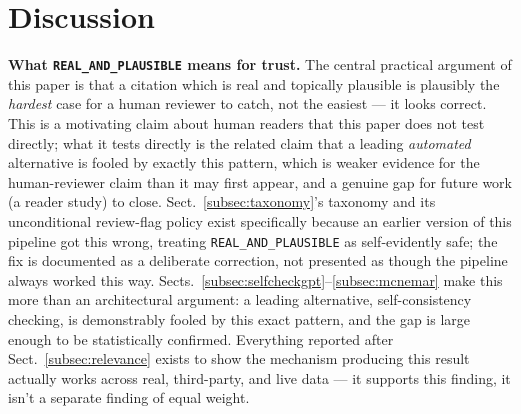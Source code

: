 \documentclass[pdflatex,sn-mathphys-num]{sn-jnl}%
\begin{document}
\section{Discussion}\label{sec:discussion}

\textbf{What \texttt{REAL\_AND\_PLAUSIBLE} means for trust.} The central
practical argument of this paper is that a citation which is real and
topically plausible is plausibly the \textit{hardest} case for a human
reviewer to catch, not the easiest --- it looks correct. This is a
motivating claim about human readers that this paper does not test
directly; what it tests directly is the related claim that a leading
\textit{automated} alternative is fooled by exactly this pattern, which
is weaker evidence for the human-reviewer claim than it may first
appear, and a genuine gap for future work (a reader study) to close.
Sect.~\ref{subsec:taxonomy}'s
taxonomy and its unconditional review-flag policy exist specifically
because an earlier version of this pipeline got this wrong, treating
\texttt{REAL\_AND\_PLAUSIBLE} as self-evidently safe; the fix is
documented as a deliberate correction, not presented as though the
pipeline always worked this way. Sects.~\ref{subsec:selfcheckgpt}--\ref{subsec:mcnemar}
make this more than an architectural argument: a leading alternative,
self-consistency checking, is demonstrably fooled by this exact pattern,
and the gap is large enough to be statistically confirmed. Everything
reported after Sect.~\ref{subsec:relevance} exists to show the mechanism
producing this result actually works across real, third-party, and live
data --- it supports this finding, it isn't a separate finding of equal
weight.
\end{document}
